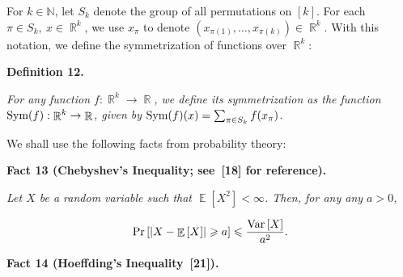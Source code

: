 \documentclass[10pt,a4paper]{article}
\begin{document}
For $k\in\mathbb{N}$, let $S_{k}$ denote the group of all permutations on $[k]$.
For each $\pi\in S_{k},\ x\in\mathop{\mathbb{R}}^{k}$, we use $x_{\pi}$ to denote $\left(x_{\pi(1)},\dots,x_{\pi(k)}\right)\in\mathop{\mathbb{R}}^{k}$.
With this notation, we define the symmetrization of functions over $\mathop{\mathbb{R}}^{k}$:\par





\par\medskip\noindent\textbf{
\textbf{Definition 12}\textbf{.}
}\par



\emph{For any function $f:\mathop{\mathbb{R}}^{k}\to\mathop{\mathbb{R}}$, we define its symmetrization as the function $\textnormal{Sym}(f):\mathop{\mathbb{R}}^{k}\to\mathop{\mathbb{R}}$, given by $\textnormal{Sym}(f)(x)=\sum_{\pi\in S_{k}}f(x_{\pi})$.}\par






We shall use the following facts from probability theory:\par





\par\medskip\noindent\textbf{
\textbf{Fact 13}\textbf{ }(Chebyshev’s Inequality; see [18] for reference)\textbf{.}
}\par



\emph{Let $X$ be a random variable such that $\mathop{\mathbb{E}}\left[X^{2}\right]<\infty$.
Then, for any any $a>0$,}\par


\[\begin{gathered}
\Pr\left[\left|X-\mathop{\mathbb{E}}\left[X\right]\right|\geqslant a\right]\leqslant\frac{\textnormal{Var}\left[X\right]}{a^{2}}.
\end{gathered}\]







\par\medskip\noindent\textbf{
\textbf{Fact 14}\textbf{ }(Hoeffding’s Inequality [21])\textbf{.}
}\par
\end{document}
